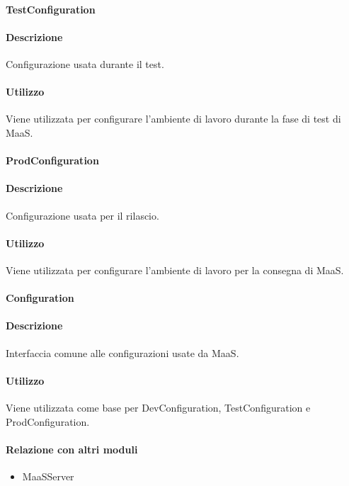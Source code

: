 \paragraph{TestConfiguration}
\paragraph*{Descrizione}
Configurazione usata durante il test.

\paragraph*{Utilizzo}
Viene utilizzata per configurare l'ambiente di lavoro durante la fase di test di MaaS.

\paragraph{ProdConfiguration}
\paragraph*{Descrizione}
Configurazione usata per il rilascio.

\paragraph*{Utilizzo}
Viene utilizzata per configurare l'ambiente di lavoro per la consegna di MaaS.

\paragraph{Configuration}
\paragraph*{Descrizione}
Interfaccia comune alle configurazioni usate da MaaS.

\paragraph*{Utilizzo}
Viene utilizzata come base per DevConfiguration, TestConfiguration e ProdConfiguration.

\paragraph*{Relazione con altri moduli}
\begin{itemize}
\item MaaSServer
\end{itemize}

